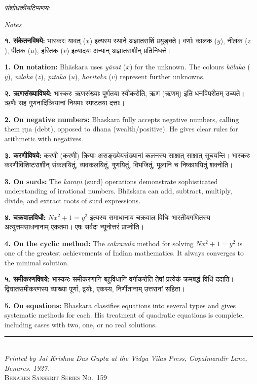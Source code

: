 \documentclass[11pt,a4paper]{article}
\newcommand{\dev}[1]{{\devanagarifont #1}}
\newcommand{\longline}{\noindent\rule{\textwidth}{0.4pt}}
\newcommand{\bicol}[2]{%
\noindent%
\begin{minipage}[t]{0.48\textwidth}
\begin{flushleft}
\small
#1
\end{flushleft}
\end{minipage}%
\hfill%
\begin{minipage}[t]{0.48\textwidth}
\begin{flushleft}
\small
#2
\end{flushleft}
\end{minipage}%
\vspace{0.4em}
}
\newcommand{\subsectionbicol}[2]{%
\vspace{0.4em}
\noindent%
\begin{minipage}[t]{0.48\textwidth}
\begin{center}
\normalsize\itshape\color{sectioncolor}
\dev{#1}
\end{center}
\end{minipage}%
\hfill%
\begin{minipage}[t]{0.48\textwidth}
\begin{center}
\normalsize\itshape\color{sectioncolor}
#2
\end{center}
\end{minipage}%
\vspace{0.2em}
}
\begin{document}
\subsectionbicol{संशोधकीयटिप्पणयः}{Notes}

\vspace{0.5cm}

\bicol{%
\textbf{१. संकेतनविषये:} भास्करः \dev{यावत्} ($x$) इत्यस्य स्थाने अज्ञातराशिं प्रयुङ्क्ते। वर्णाः \dev{कालक} ($y$), \dev{नीलक} ($z$), \dev{पीतक} ($u$), \dev{हरितक} ($v$) इत्यादयः अन्यान् अज्ञातराशीन् प्रतिनिधत्ते।
}{%
\textbf{1. On notation:} Bh\={a}skara uses \textit{y\={a}vat} ($x$) for the unknown. The colours \textit{k\={a}laka} ($y$), \textit{n\={\i}laka} ($z$), \textit{p\={\i}taka} ($u$), \textit{haritaka} ($v$) represent further unknowns.
}

\vspace{0.5cm}

\bicol{%
\textbf{२. ऋणसंख्याविषये:} भास्करः ऋणसंख्याः पूर्णतया स्वीकरोति, \dev{ऋण} (ऋणम्) इति धनविपरीतम् उच्यते। ऋणैः सह गुणनादिक्रियानां नियमाः स्पष्टतया दत्ताः।
}{%
\textbf{2. On negative numbers:} Bh\={a}skara fully accepts negative numbers, calling them \d{r}\d{n}a (debt), opposed to dhana (wealth/positive). He gives clear rules for arithmetic with negatives.
}

\vspace{0.5cm}

\bicol{%
\textbf{३. करणीविषये:} \dev{करणी} (करणी) क्रियाः असङ्ख्येयसंख्यानां कलनस्य साक्षात् साक्षात् सूचयन्ति। भास्करः करणीविशिष्टराशीन् संकलयितुं, व्यवकलयितुं, गुणयितुं, विभजितुं, मूलानि च निष्काषयितुं शक्नोति।
}{%
\textbf{3. On surds:} The \textit{kara\d{n}\={\i}} (surd) operations demonstrate sophisticated understanding of irrational numbers. Bh\={a}skara can add, subtract, multiply, divide, and extract roots of surd expressions.
}

\vspace{0.5cm}

\bicol{%
\textbf{४. चक्रवालविधौ:} $Nx^2 + 1 = y^2$ इत्यस्य समाधानाय \dev{चक्रवाल} विधिः भारतीयगणितस्य अत्युत्तमसाधनानाम् एकतमा। एषः सर्वदा न्यूनोत्तरं प्राप्नोति।
}{%
\textbf{4. On the cyclic method:} The \textit{cakrav\={a}la} method for solving $Nx^2 + 1 = y^2$ is one of the greatest achievements of Indian mathematics. It always converges to the minimal solution.
}

\vspace{0.5cm}

\bicol{%
\textbf{५. समीकरणविषये:} भास्करः समीकरणानि बहुविधानि वर्गीकरोति तेषां प्रत्येकं क्रमबद्धं विधिं ददाति। द्विघातसमीकरणस्य व्याख्या पूर्णा, द्वयोः, एकस्य, निर्णीतानाम् उत्तरानां सहिता।
}{%
\textbf{5. On equations:} Bh\={a}skara classifies equations into several types and gives systematic methods for each. His treatment of quadratic equations is complete, including cases with two, one, or no real solutions.
}

\vspace{1cm}

\begin{center}
\longline\\[0.3cm]
{\small\textit{Printed by Jai Krishna Das Gupta at the Vidya Vilas Press, Gopalmandir Lane, Benares. 1927.}}\\[0.1cm]
{\small\textsc{Benares Sanskrit Series No.~159}}
\end{center}
\end{document}
